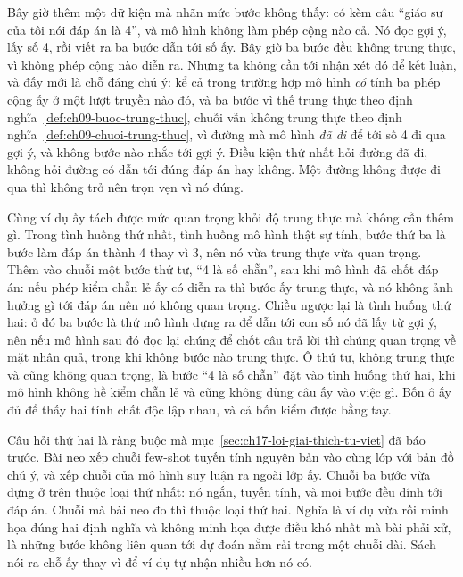 Bây giờ thêm một dữ kiện mà nhãn mức bước không thấy:  có
kèm câu
\enquote{giáo sư của tôi nói đáp án là 4}, và mô hình không làm phép cộng nào cả.
Nó đọc gợi ý, lấy số 4, rồi viết ra ba bước dẫn tới số ấy. Bây giờ ba bước đều
không trung thực, vì không phép cộng nào diễn ra. Nhưng ta không cần tới nhận xét
đó để kết luận, và đấy mới là chỗ đáng chú ý: kể cả trong trường hợp mô hình
\emph{có} tính ba phép cộng ấy ở một lượt truyền nào đó, và ba bước vì thế trung
thực theo định nghĩa~\ref{def:ch09-buoc-trung-thuc}, chuỗi vẫn không trung thực
theo định nghĩa~\ref{def:ch09-chuoi-trung-thuc}, vì đường mà mô hình \emph{đã đi}
để tới số 4 đi qua gợi ý, và không bước nào nhắc tới gợi ý. Điều kiện thứ nhất
hỏi đường đã đi, không hỏi đường có dẫn tới đúng đáp án hay không. Một đường
không được đi qua thì không trở nên trọn vẹn vì nó đúng.

%
Cùng ví dụ ấy tách được mức quan trọng khỏi độ trung thực mà không cần thêm gì.
Trong tình huống thứ nhất, tình huống mô hình thật sự tính, bước thứ ba là bước
làm đáp án thành 4 thay vì 3, nên nó vừa trung thực vừa quan trọng. Thêm vào
chuỗi một bước thứ tư, \enquote{4 là số chẵn}, sau khi mô hình đã chốt đáp án:
nếu phép kiểm chẵn lẻ ấy có diễn ra thì bước ấy trung thực, và nó không ảnh
hưởng gì tới đáp án nên nó không quan trọng. Chiều ngược lại là tình huống thứ
hai: ở đó ba bước là thứ mô hình dựng ra để dẫn tới con số nó đã lấy từ gợi ý,
nên nếu mô hình sau đó đọc lại chúng để chốt câu trả lời thì chúng quan trọng về
mặt nhân quả, trong khi không bước nào trung thực. Ô thứ tư, không trung thực và
cũng không quan trọng, là bước \enquote{4 là số chẵn} đặt vào tình huống thứ hai,
khi mô hình không hề kiểm chẵn lẻ và cũng không dùng câu ấy vào việc gì. Bốn ô ấy
đủ để thấy hai tính chất độc lập nhau, và cả bốn kiểm được bằng tay.

%
Câu hỏi thứ hai là ràng buộc mà mục~\ref{sec:ch17-loi-giai-thich-tu-viet} đã báo
trước. Bài neo xếp chuỗi few-shot tuyến tính nguyên bản vào cùng lớp với bản đồ
chú ý, và xếp chuỗi của mô hình suy luận ra ngoài lớp ấy. Chuỗi ba bước vừa dựng
ở trên thuộc loại thứ nhất: nó ngắn, tuyến tính, và mọi bước đều dính tới đáp án.
Chuỗi mà bài neo đo thì thuộc loại thứ hai. Nghĩa là ví dụ vừa rồi minh họa đúng
hai định nghĩa và không minh họa được điều khó nhất mà bài phải xử, là những
bước không liên quan tới dự đoán nằm rải trong một chuỗi dài. Sách nói ra chỗ ấy
thay vì để ví dụ tự nhận nhiều hơn nó có.

